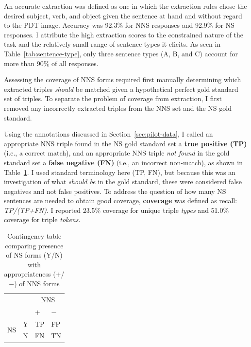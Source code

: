 An accurate extraction was defined as one in which the extraction rules chose the desired subject, verb, and object given the sentence at hand and without regard to the PDT image. Accuracy was 92.3\% for NNS responses and 92.9\% for NS responses. I attribute the high extraction scores to the constrained nature of the task and the relatively small range of sentence types it elicits. As seen in Table~\ref{tab:sentence-type}, only three sentence types (A, B, and C) account for more than 90\% of all responses.

Assessing the coverage of NNS forms required first manually determining which extracted triples \textit{should} be matched given a hypothetical perfect gold standard set of triples. To separate the problem of coverage from extraction, I first removed any incorrectly extracted triples from the NNS set and the NS gold standard.

Using the annotations discussed in Section~\ref{sec:pilot-data}, I called an appropriate NNS triple found in the NS gold standard set a \textbf{true positive (TP)} (i.e., a correct match), and an appropriate NNS triple \textit{not found} in the gold standard set a \textbf{false negative (FN)} (i.e., an incorrect non-match), as shown in Table~\ref{tab:contingencies}. I used standard terminology here (TP, FN), but because this was an investigation of what \emph{should be} in the gold standard, these were considered
false negatives and not false positives.  To address the question of
how many NS sentences are needed to obtain good coverage, \textbf{coverage} was defined as recall: \textit{TP/(TP+FN)}. I reported 23.5\% coverage for unique triple \textit{types} and 51.0\% coverage for triple \textit{tokens}.

\begin{table}[htb!]
\begin{center}
\begin{tabular}{|ll||l|l|}
  \hline
  & & \multicolumn{2}{c|}{NNS}\\
  & & $+$ & $-$ \\
  \hline
  \hline
  \multirow{2}{*}{NS} & Y & TP & FP \\
  \cline{2-4}
  & N & FN & TN\\
  \hline
\end{tabular}
\end{center}
\caption{Contingency table comparing presence of NS forms (Y/N) with
  appropriateness ($+$/$-$) of NNS forms}
\label{tab:contingencies}
\end{table}

